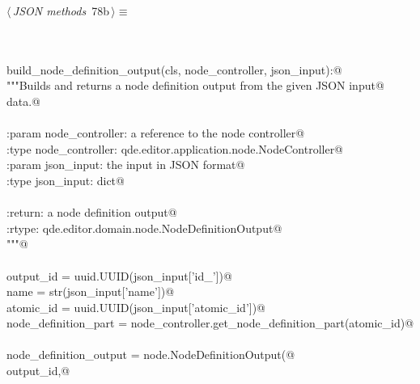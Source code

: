 \documentclass[
    a4paper,      %
    10pt,         %
    openright,    %
    notitlepage,  %
    parskip=half, %
]{scrreprt}       %
\theoremstyle{definition}                    %
\begin{document}
\begin{flushleft} \small
\begin{minipage}{\linewidth}\label{scrap127}\raggedright\small
{} $\langle\,${\itshape JSON methods}\nobreak\ {\footnotesize {78b}}$\,\rangle\equiv$
\vspace{-1exm}
\begin{list}{}{} \item
\mbox{}\lstinline@@\\
\mbox{}\lstinline@classmethod@\\
\mbox{}\lstinline@def build_node_definition_output(cls, node_controller, json_input):@\\
\mbox{}\lstinline@    """Builds and returns a node definition output from the given JSON input@\\
\mbox{}\lstinline@    data.@\\
\mbox{}\lstinline@@\\
\mbox{}\lstinline@    :param node_controller: a reference to the node controller@\\
\mbox{}\lstinline@    :type  node_controller: qde.editor.application.node.NodeController@\\
\mbox{}\lstinline@    :param json_input: the input in JSON format@\\
\mbox{}\lstinline@    :type  json_input: dict@\\
\mbox{}\lstinline@@\\
\mbox{}\lstinline@    :return: a node definition output@\\
\mbox{}\lstinline@    :rtype:  qde.editor.domain.node.NodeDefinitionOutput@\\
\mbox{}\lstinline@    """@\\
\mbox{}\lstinline@@\\
\mbox{}\lstinline@    output_id             = uuid.UUID(json_input['id_'])@\\
\mbox{}\lstinline@    name                 = str(json_input['name'])@\\
\mbox{}\lstinline@    atomic_id            = uuid.UUID(json_input['atomic_id'])@\\
\mbox{}\lstinline@    node_definition_part = node_controller.get_node_definition_part(atomic_id)@\\
\mbox{}\lstinline@@\\
\mbox{}\lstinline@    node_definition_output = node.NodeDefinitionOutput(@\\
\mbox{}\lstinline@        output_id,@\\

\end{list}
\end{minipage}
\end{flushleft}
\end{document}

